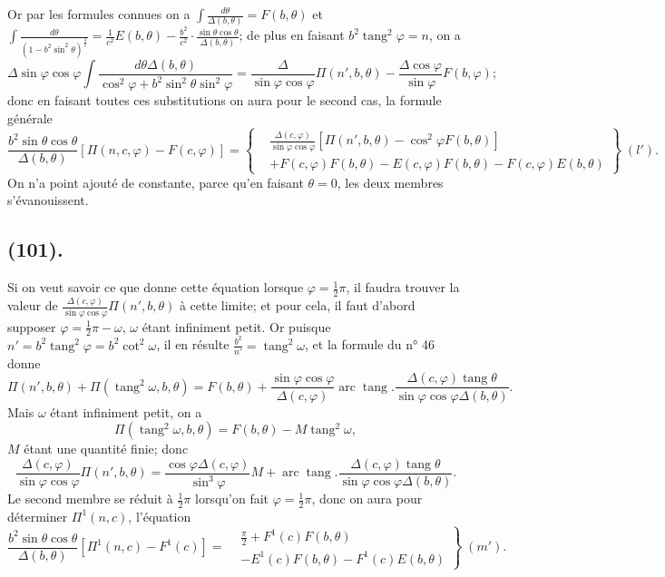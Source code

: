 \documentclass{article}
\begin{document}
Or par les formules connues on a $\displaystyle\int\frac{d\theta}{\Delta(b,\theta)}=F(b,\theta)$ et $\displaystyle\int\frac{d\theta}{(1-b^{2}\sin^{2}\theta)^{\frac{3}{2}}}=\frac{1}{c^{2}}E(b,\theta)-\frac{b^{2}}{c^{2}}\cdot\frac{\sin\theta\cos\theta}{\Delta(b,\theta)}$; de plus en faisant $b^{2}\operatorname{tang}^{2}\varphi=n$, on a
\[ \Delta\sin\varphi\cos\varphi\int\frac{d\theta\Delta(b,\theta)}{\cos^{2}\varphi+b^{2}\sin^{2}\theta\sin^{2}\varphi}=\frac{\Delta}{\sin\varphi\cos\varphi}\Pi(n',b,\theta)-\frac{\Delta\cos\varphi}{\sin\varphi}F(b,\varphi); \]
donc en faisant toutes ces substitutions on aura pour le second cas, la formule générale
\[ \frac{b^{2}\sin\theta\cos\theta}{\Delta(b,\theta)}[\Pi(n,c,\varphi)-F(c,\varphi)]=\left\{\begin{aligned} &\frac{\Delta(c,\varphi)}{\sin\varphi\cos\varphi}[\Pi(n',b,\theta)-\cos^{2}\varphi F(b,\theta)]\\ &+F(c,\varphi)F(b,\theta)-E(c,\varphi)F(b,\theta)-F(c,\varphi)E(b,\theta) \end{aligned}\right\}\;(l'). \]
On n'a point ajouté de constante, parce qu'en faisant $\theta=0$, les deux membres s'évanouissent.

\subsection*{(101).}

Si on veut savoir ce que donne cette équation lorsque $\varphi=\tfrac{1}{2}\pi$, il faudra trouver la valeur de $\frac{\Delta(c,\varphi)}{\sin\varphi\cos\varphi}\Pi(n',b,\theta)$ à cette limite; et pour cela, il faut d'abord supposer $\varphi=\tfrac{1}{2}\pi-\omega$, $\omega$ étant infiniment petit. Or puisque $n'=b^{2}\operatorname{tang}^{2}\varphi=b^{2}\cot^{2}\omega$, il en résulte $\frac{b^{2}}{n'}=\operatorname{tang}^{2}\omega$, et la formule du n° 46 donne
\[ \Pi(n',b,\theta)+\Pi(\operatorname{tang}^{2}\omega,b,\theta)=F(b,\theta)+\frac{\sin\varphi\cos\varphi}{\Delta(c,\varphi)}\operatorname{arc}\operatorname{tang}.\frac{\Delta(c,\varphi)\operatorname{tang}\theta}{\sin\varphi\cos\varphi\Delta(b,\theta)}. \]
Mais $\omega$ étant infiniment petit, on a
\[ \Pi(\operatorname{tang}^{2}\omega,b,\theta)=F(b,\theta)-M\operatorname{tang}^{2}\omega, \]
$M$ étant une quantité finie; donc
\[ \frac{\Delta(c,\varphi)}{\sin\varphi\cos\varphi}\Pi(n',b,\theta)=\frac{\cos\varphi\Delta(c,\varphi)}{\sin^{3}\varphi}M+\operatorname{arc}\operatorname{tang}.\frac{\Delta(c,\varphi)\operatorname{tang}\theta}{\sin\varphi\cos\varphi\Delta(b,\theta)}. \]
Le second membre se réduit à $\tfrac{1}{2}\pi$ lorsqu'on fait $\varphi=\tfrac{1}{2}\pi$, donc on aura pour déterminer $\Pi^{1}(n,c)$, l'équation
\[ \frac{b^{2}\sin\theta\cos\theta}{\Delta(b,\theta)}[\Pi^{1}(n,c)-F^{1}(c)]=\left.\begin{aligned} &\frac{\pi}{2}+F^{1}(c)F(b,\theta)\\ &-E^{1}(c)F(b,\theta)-F^{1}(c)E(b,\theta) \end{aligned}\right\}\;(m'). \]
\end{document}
